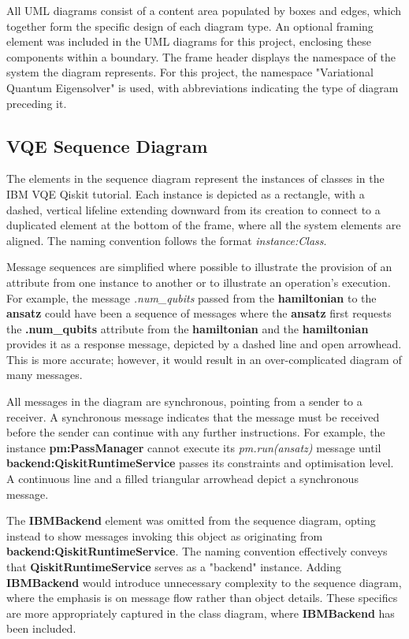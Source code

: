 \documentclass{article}
\begin{document}
All UML diagrams consist of a content area populated by boxes and edges, which together form the specific design of each diagram type. An optional framing element was included in the UML diagrams for this project, enclosing these components within a boundary. The frame header displays the namespace of the system the diagram represents\cite{UMLElementFrame}. For this project, the namespace "Variational Quantum Eigensolver" is used, with abbreviations indicating the type of diagram preceding it. 

\subsection{VQE Sequence Diagram}

The elements in the sequence diagram represent the instances of classes in the IBM VQE Qiskit tutorial. Each instance is depicted as a rectangle, with a dashed, vertical lifeline extending downward from its creation to connect to a duplicated element at the bottom of the frame, where all the system elements are aligned. The naming convention follows the format \textit{instance:Class}.

Message sequences are simplified where possible to illustrate the provision of an attribute from one instance to another or to illustrate an operation's execution. For example, the message \textit{.num\_qubits} passed from the \textbf{hamiltonian} to the \textbf{ansatz} could have been a sequence of messages where the \textbf{ansatz} first requests the \textbf{.num\_qubits} attribute from the \textbf{hamiltonian} and the \textbf{hamiltonian} provides it as a response message, depicted by a dashed line and open arrowhead. This is more accurate; however, it would result in an over-complicated diagram of many messages. 

All messages in the diagram are synchronous, pointing from a sender to a receiver. A synchronous message indicates that the message must be received before the sender can continue with any further instructions\cite{Seidl_Scholz_Huemer_Kappel_Duffy_2014}. For example, the instance \textbf{pm:PassManager} cannot execute its \textit{pm.run(ansatz)} message until \textbf{backend:QiskitRuntimeService} passes its constraints and optimisation level. A continuous line and a filled triangular arrowhead depict a synchronous message.

The \textbf{IBMBackend} element was omitted from the sequence diagram, opting instead to show messages invoking this object as originating from \textbf{backend:QiskitRuntimeService}.
The naming convention effectively conveys that \textbf{QiskitRuntimeService} serves as a "backend" instance. Adding \textbf{IBMBackend} would introduce unnecessary complexity to the sequence diagram, where the emphasis is on message flow rather than object details. These specifics are more appropriately captured in the class diagram, where \textbf{IBMBackend} has been included.
\end{document}
